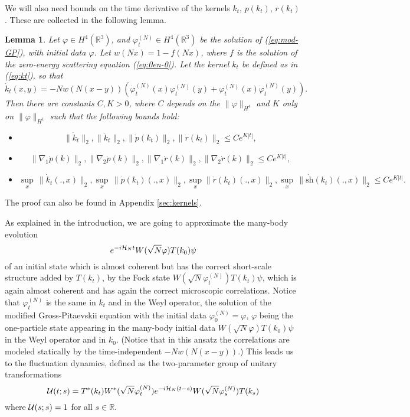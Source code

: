 \documentclass[11pt,a4paper]{article}
\newtheorem{lemma}[thm]{Lemma}
\newcommand{\cU}{{\cal U}}
\newcommand{\bR}{{\mathbb R}}
\newcommand{\cH}{{\cal H}}
\newcommand{\R}{\mathbb{R}}
\newcommand{\norm}[1]{\lVert#1\rVert}	%
\newcommand{\ph}{\varphi_t^{(N)}}	%
\begin{document}
We will also need bounds on the time derivative of the kernels $k_t$, $p(k_t)$, $r(k_t)$. These are collected in the following lemma.
\begin{lemma}\label{lm:dotk} 
Let $\varphi \in H^4(\R^3)$, and $\ph \in H^4 (\bR^3)$ be the solution of (\ref{eq:mod-GP}), with initial data $\varphi$. Let $w(Nx) = 1 - f(Nx)$, where $f$ is the solution of the zero-energy scattering equation (\ref{eq:0en-0}). Let the kernel $k_t$ be defined as in (\ref{eq:kt}), so that
\begin{equation}\label{eq:dtk} \dot{k}_t (x,y) = - N w (N (x-y)) \left( \dot{\varphi}_t^{(N)} (x) \varphi_t^{(N)} (y) + \varphi_t^{(N)} (x) \dot{\varphi}_t^{(N)} (y) \right). \end{equation}
Then there are constants $C,K >0$, where $C$ depends on the $\| \varphi \|_{H^4}$ and $K$ only on $\| \varphi \|_{H^1}$ such that the following bounds hold: 
\begin{itemize}
\item[(i)]   
 \[  \| \dot{k}_t \|_2 ,  \| \ddot k_t \|_2 , \| \dot{p} (k_t) \|_2 , \| \dot{r} (k_t) \|_2  \leq C e^{K|t|}, \]
\item[(ii)] 
\[ \| \nabla_1 \dot p (k) \|_2 ,  \| \nabla_2 \dot p (k) \|_2 , \| \nabla_1 \dot r (k) \|_2,  \| \nabla_2 \dot r (k) \|_2  \leq C  e^{K|t|}, \]
\item[(iii)] 
\[
\sup_x \, \norm{\dot k_t (., x)}_{2} ,  \sup_x \, \norm{\dot p (k_t) (., x)}_{2}, \sup_x \norm{\dot r (k_t) (., x)}_{2}, \sup_x \, \| \dot{\text{sh}} (k_t) (., x) \|_2  \leq C e^{K|t|}.
\] 
 \end{itemize}
 \end{lemma}
The proof can also be found in Appendix \ref{sec:kernels}. 

\medskip

As explained in the introduction, we are going to approximate the many-body evolution
\[ e^{-i \cH_N t} W(\sqrt{N} \varphi ) T(k_0) \psi \]
of an initial state which is almost coherent but has the correct short-scale structure added by $T(k_t)$, by the Fock state $W(\sqrt{N} \varphi_t^{(N)}) T(k_t) \psi$, which is again almost coherent and has again the correct microscopic correlations. Notice that $\ph$ is the same in $k_t$ and in the Weyl operator, the solution of the modified Gross-Pitaevskii equation with the initial data $\varphi^{(N)}_0 = \varphi$, $\varphi$ being the one-particle state appearing in the many-body initial data $ W(\sqrt{N} \varphi ) T(k_0) \psi$ in the Weyl operator and in $k_0$. (Notice that in this ansatz the correlations are modeled statically by the time-independent $-N w(N(x-y))$.) This leads us to the fluctuation dynamics, defined as the two-parameter group of unitary transformations 
\begin{equation}\label{eq:cU} \cU (t;s) = T^* (k_t) W^* (\sqrt{N} \varphi_t^{(N)}) e^{-i\cH_N (t-s)} W(\sqrt{N} \varphi_s^{(N)}) T(k_s) \end{equation}
where $\cU (s;s) = 1$ for all $s \in \bR$. 
\end{document}
